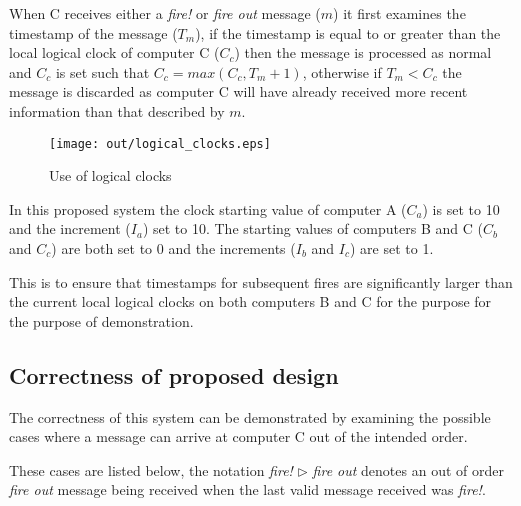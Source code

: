 \documentclass[twocolumn]{article}
\begin{document}
When C receives either a \textit{fire!} or \textit{fire out} message ($m$) it
first examines the timestamp of the message ($T_{m}$), if the timestamp is equal
to or greater than the local logical clock of computer C ($C_{c}$) then the
message is processed as normal and $C_{c}$ is set such that $C_{c} = max(C_{c},
T_{m} + 1)$, otherwise if $T_{m} < C_{c}$ the message is discarded as computer C
will have already received more recent information than that described by $m$.

\begin{figure}[h!]
  \centering
  \texttt{[image: out/logical\_clocks.eps]}
  \caption{Use of logical clocks}
  \label{fig:logical_clocks}
\end{figure}

In this proposed system the clock starting value of computer A ($C_{a}$) is set
to 10 and the increment ($I_{a}$) set to 10. The starting values of computers B
and C ($C_{b}$ and $C_{c}$) are both set to 0 and the increments ($I_{b}$ and
$I_{c}$) are set to 1.

This is to ensure that timestamps for subsequent fires are significantly larger
than the current local logical clocks on both computers B and C for the purpose
for the purpose of demonstration.

\subsection{Correctness of proposed design}

The correctness of this system can be demonstrated by examining the possible
cases where a message can arrive at computer C out of the intended order.

These cases are listed below, the notation \textit{fire!} $\rhd$ \textit{fire
out} denotes an out of order \textit{fire out} message being received when the
last valid message received was \textit{fire!}.
\end{document}
